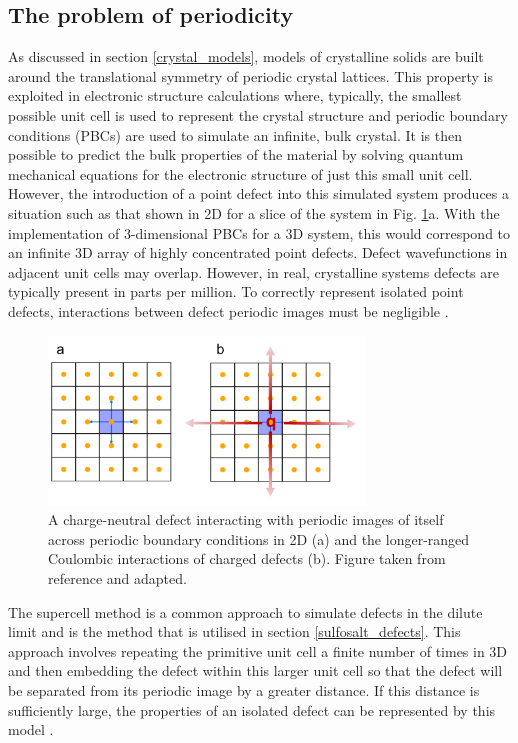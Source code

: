 \documentclass[11pt, twoside]{report}
\begin{document}
\subsection{The problem of periodicity}
As discussed in section \ref{crystal_models}, models of crystalline solids are built around the translational symmetry of periodic crystal lattices. This property is exploited in electronic structure calculations where, typically, the smallest possible unit cell is used to represent the crystal structure and periodic boundary conditions (PBCs) are used to simulate an infinite, bulk crystal. It is then possible to predict the bulk properties of the material by solving quantum mechanical equations for the electronic structure of just this small unit cell. However, the introduction of a point defect into this simulated system produces a situation such as that shown in 2D for a slice of the system in Fig. \ref{defect_PBCs}a. With the implementation of 3-dimensional PBCs for a 3D system, this would correspond to an infinite 3D array of highly concentrated point defects. Defect wavefunctions in adjacent unit cells may overlap. However, in real, crystalline systems defects are typically present in parts per million.  To correctly represent isolated point defects, interactions between defect periodic images must be negligible \cite{freysoldt_rev}.

\begin{figure}[h!]
  \centering
    \includegraphics[width=0.75\textwidth]{figures/ase_defects.png}
    \caption{A charge-neutral defect interacting with periodic images of itself across periodic boundary conditions in 2D (a) and the longer-ranged Coulombic interactions of charged defects (b). Figure taken from reference  and adapted.}
  \label{defect_PBCs}
\end{figure}

The supercell method is a common approach to simulate defects in the dilute limit and is the method that is utilised in section \ref{sulfosalt_defects}. This approach involves repeating the primitive unit cell a finite number of times in 3D and then embedding the defect within this larger unit cell so that the defect will be separated from its periodic image by a greater distance. If this distance is sufficiently large, the properties of an isolated defect can be represented by this model \cite{freysoldt_rev}.
\end{document}
